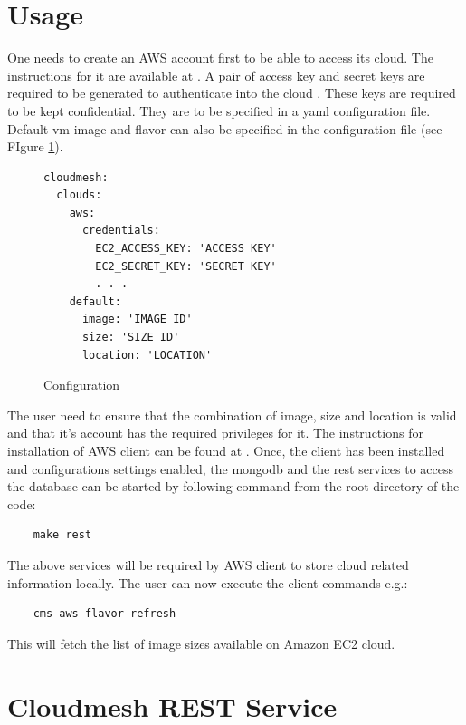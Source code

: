 \documentclass[9pt,twocolumn,twoside]{../../styles/osajnl}
\begin{document}
\section{Usage}

One needs to create an AWS account first to be able to access its
cloud. The instructions for it are available at
\cite{www-amazon-aws}. A pair of access key and secret keys are
required to be generated to authenticate into the cloud
\cite{www-amazon-key}. These keys are required to be kept
confidential. They are to be specified in a yaml configuration
file. Default vm image and flavor can also be specified in the
configuration file (see FIgure \ref{F:conf}). 

\begin{figure}[htb]
\begin{verbatim} 
cloudmesh:
  clouds:
    aws:
      credentials:
        EC2_ACCESS_KEY: 'ACCESS KEY'
        EC2_SECRET_KEY: 'SECRET KEY'
        . . .
    default:
      image: 'IMAGE ID'
      size: 'SIZE ID'
      location: 'LOCATION'
\end{verbatim}
\vspace{-1.0\baselineskip}
\caption{Configuration}\label{F:conf}
\end{figure}

The user need to ensure that the combination of image, size and
location is valid and that it's account has the required privileges
for it. The instructions for installation of AWS client can be found
at \cite{www-cloudmesh-aws}. Once, the client has been installed and
configurations settings enabled, the mongodb and the rest services to
access the database can be started by following command from the root
directory of the code:

\begin{verbatim}
    make rest
\end{verbatim}

The above services will be required by AWS client to store cloud
related information locally. The user can now execute the client
commands e.g.:

\begin{verbatim}
    cms aws flavor refresh
\end{verbatim}

This will fetch the list of image sizes available on Amazon EC2 cloud.

\section{Cloudmesh REST Service}
\end{document}
